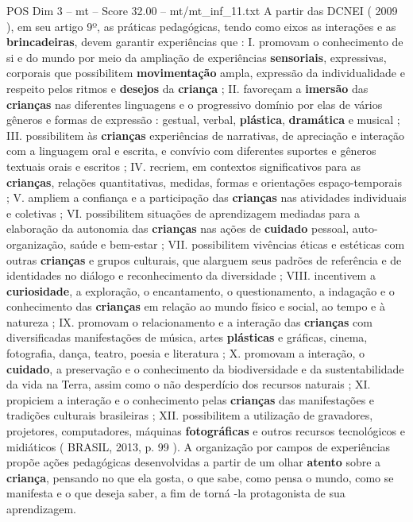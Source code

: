 \begin{textsample}{POS Dim 3 – mt – Score 32.00 – mt/mt\_inf\_11.txt}
A partir das DCNEI ( 2009 ), em seu artigo 9º, as práticas pedagógicas, tendo como eixos as interações e as \textbf{brincadeiras}, devem garantir experiências que : I. promovam o conhecimento de si e do mundo por meio da ampliação de experiências \textbf{sensoriais}, expressivas, corporais que possibilitem \textbf{movimentação} ampla, expressão da individualidade e respeito pelos ritmos e \textbf{desejos} da \textbf{criança} ; II. favoreçam a \textbf{imersão} das \textbf{crianças} nas diferentes linguagens e o progressivo domínio por elas de vários gêneros e formas de expressão : gestual, verbal, \textbf{plástica}, \textbf{dramática} e musical ; III. possibilitem às \textbf{crianças} experiências de narrativas, de apreciação e interação com a linguagem oral e escrita, e convívio com diferentes suportes e gêneros textuais orais e escritos ; IV. recriem, em contextos significativos para as \textbf{crianças}, relações quantitativas, medidas, formas e orientações espaço-temporais ; V. ampliem a confiança e a participação das \textbf{crianças} nas atividades individuais e coletivas ; VI. possibilitem situações de aprendizagem mediadas para a elaboração da autonomia das \textbf{crianças} nas ações de \textbf{cuidado} pessoal, auto-organização, saúde e bem-estar ; VII. possibilitem vivências éticas e estéticas com outras \textbf{crianças} e grupos culturais, que alarguem seus padrões de referência e de identidades no diálogo e reconhecimento da diversidade ; VIII. incentivem a \textbf{curiosidade}, a exploração, o encantamento, o questionamento, a indagação e o conhecimento das \textbf{crianças} em relação ao mundo físico e social, ao tempo e à natureza ; IX. promovam o relacionamento e a interação das \textbf{crianças} com diversificadas manifestações de música, artes \textbf{plásticas} e gráficas, cinema, fotografia, dança, teatro, poesia e literatura ; X. promovam a interação, o \textbf{cuidado}, a preservação e o conhecimento da biodiversidade e da sustentabilidade da vida na Terra, assim como o não desperdício dos recursos naturais ; XI. propiciem a interação e o conhecimento pelas \textbf{crianças} das manifestações e tradições culturais brasileiras ; XII. possibilitem a utilização de gravadores, projetores, computadores, máquinas \textbf{fotográficas} e outros recursos tecnológicos e midiáticos ( BRASIL, 2013, p. 99 ).
A organização por campos de experiências propõe ações pedagógicas desenvolvidas a partir de um olhar \textbf{atento} sobre a \textbf{criança}, pensando no que ela gosta, o que sabe, como pensa o mundo, como se manifesta e o que deseja saber, a fim de torná -la protagonista de sua aprendizagem.

\end{textsample}
